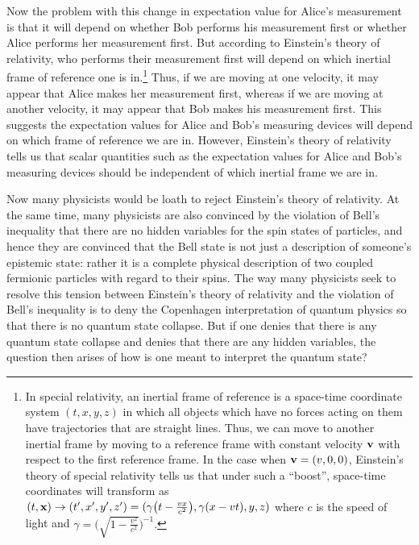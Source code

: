       Now the problem\label{Copenhagenproblem} with this change in expectation value for Alice's measurement is that it will depend on whether Bob performs his measurement first or whether Alice performs her measurement first. But according to Einstein's theory of relativity, who performs their measurement first will depend on which inertial frame of reference one is in.\footnote{In special relativity, an inertial frame of reference is a space-time coordinate system $(t, x, y, z)$ in which all objects which have no forces acting on them have trajectories that are straight lines. Thus, we can move to another inertial frame by moving to a reference frame with constant velocity $\vb{v}$ with respect to the first reference frame. In the case when $\vb{v}=(v, 0, 0)$, Einstein's theory of special relativity tells us that under such a “boost”, space-time coordinates will transform as $(t,\vb{x})\rightarrow(t',x',y',z')=(\gamma\big(t - \frac{vx}{c^2}\big),\gamma(x-vt),y,z)$ where $c$ is the speed of light and $\gamma=\Big(\sqrt{1-\frac{v^2}{c^2}}\Big)^{-1}.$ } Thus, if we are moving at one velocity, it may appear that Alice makes her measurement first, whereas if we are moving at another velocity, it may appear that Bob makes his measurement first. This suggests the expectation values for Alice and Bob's measuring devices will depend on which frame of reference we are in. However, Einstein's theory of relativity tells us that scalar quantities such as the expectation values for Alice and Bob's measuring devices should be independent of which inertial frame we are in. 
      
      Now many physicists would be loath to reject Einstein's theory of relativity. At the same time, many physicists are also convinced by the violation of Bell's inequality that there are no hidden variables for the spin states of particles, and hence they are convinced that the Bell state is not just a description of someone's epistemic state: rather it is a complete physical description of two coupled fermionic particles with regard to their spins. The way many physicists seek to resolve this tension between Einstein's theory of relativity and the violation of Bell's inequality is to deny the Copenhagen interpretation of quantum physics so that there is no quantum state collapse. But if one denies that there is any quantum state collapse and denies that there are any hidden variables, the question then arises of how is one  meant to interpret the quantum state? 
     
